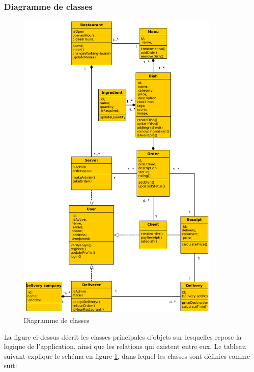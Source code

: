 \documentclass[french, a4paper, 12pt]{report}
\begin{document}
		\newpage
		\subsubsection{Diagramme de classes}
			\begin{figure}[!h]
  				\center
  				\includegraphics[width=10cm]{classdiag.png}
  				\caption{Diagramme de classes}
  				\label{fig:classdiag}
			\end{figure}
			
			La figure ci-dessus décrit les classes principales d'objets sur lesquelles repose la logique de l'application, ainsi que les relations qui existent entre eux.
			\newpage
			Le tableau suivant explique le schéma en figure \ref{fig:classdiag}, dans lequel les classes sont définies comme suit:
			
\end{document}
